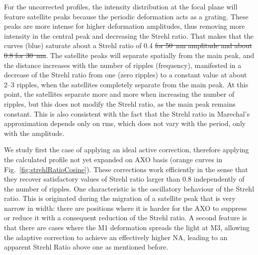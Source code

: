 \documentclass{iucr}
\newcommand{\replace}[2]{{\color{blue}#1}{\color{blue}\sout{#2}}}
\begin{document}
For the uncorrected profiles, the intensity distribution at the focal plane will feature satellite peaks because the periodic deformation acts as a grating. These peaks are more intense for higher deformation amplitudes, thus removing more intensity in the central peak and decreasing the Strehl ratio. That makes that the curves (blue) saturate about a Strehl ratio of 0.4\replace{}{ for 50~nm amplitude and about 0.8 for 30~nm}. The satellite peaks will separate spatially from the main peak, and the distance increases with the number of ripples (frequency), manifested in a decrease of the Strehl ratio from one (zero ripples) to a constant value at about 2--3 ripples, when the satellites completely separate from the main peak. At this point, the satellites separate more and more when increasing the number of ripples, but this does not modify the Strehl ratio, as the main peak remains constant. This is also consistent with the fact that the Strehl ratio in Marechal's approximation depends only on rms, which does not vary with the period, only with the amplitude.

We study first the case of applying an ideal active correction, therefore applying the calculated profile not yet expanded on AXO basis (orange curves in Fig.~\ref{fig:strehlRatioCosine}). These corrections work efficiently in the sense that they recover satisfactory values of Strehl ratio larger than 0.8 independently of the number of ripples. One characteristic is the oscillatory behaviour of the Strehl ratio. This is originated during the migration of a satellite peak that is very narrow in width: there are positions where it is harder for the AXO to suppress or reduce it with a consequent reduction of the Strehl ratio. A second feature is that there are cases where the M1 deformation spreads the light at M3, allowing the adaptive correction to achieve an effectively higher NA, leading to an apparent Strehl Ratio above one as mentioned before.
\end{document}
